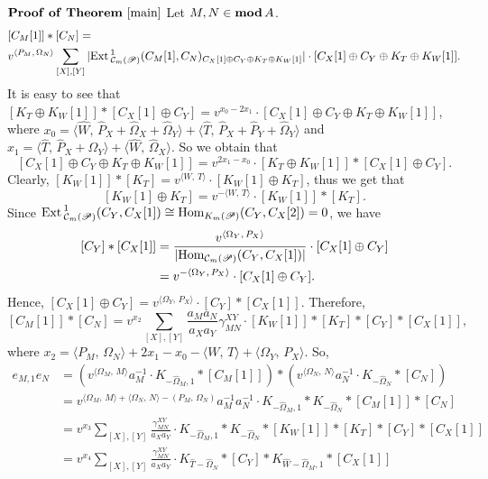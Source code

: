 \documentclass[reqno,12pt]{amsart}
\numberwithin{equation}{section}
\theoremstyle{plain}
\theoremstyle{definition}
\begin{document}
\noindent $\mathbf{Proof~of~Theorem~\ref{main}}$ Let $M,N\in{\mbox{\rm \textbf{mod}}\,} A$.
\begin{equation*}\begin{split}&[C_M[1]]\ast[C_N]=\\&v^{{\langle {P_M,\,\Omega_N}\rangle}}\sum\limits_{[X],[Y]}
|{\mbox{\rm Ext}\,}^1_{\mathcal{C}_m({{\mathscr{P}}})}(C_M[1],C_N)_{C_X[1]\oplus C_Y\oplus K_T\oplus K_W[1]}|\cdot[C_X[1]\oplus C_Y\oplus K_T\oplus K_W[1]].\end{split}\end{equation*}
It is easy to see that $[K_T\oplus K_W[1]]\ast[C_X[1]\oplus C_Y]=v^{x_0-2x_1}\cdot[C_X[1]\oplus C_Y\oplus K_T\oplus K_W[1]]$, where $x_0={\langle {\hat{W},\,\hat{P}_X+\hat{\Omega}_X+\hat{\Omega}_Y}\rangle}+{\langle {\hat{T},\,\hat{P}_X+\hat{P}_Y+\hat{\Omega}_Y}\rangle}$ and $x_1={\langle {\hat{T},\,\hat{P}_X+\hat{\Omega}_Y}\rangle}+{\langle {\hat{W},\,\hat{\Omega}_X}\rangle}$. So we obtain that
$$[C_X[1]\oplus C_Y\oplus K_T\oplus K_W[1]]=v^{2x_1-x_0}\cdot[K_T\oplus K_W[1]]\ast[C_X[1]\oplus C_Y].$$
Clearly, $[K_W[1]]\ast[K_T]=v^{{\langle {W,\,T}\rangle}}\cdot[K_W[1]\oplus K_T]$, thus we get that
$$[K_W[1]\oplus K_T]=v^{-{\langle {W,\,T}\rangle}}\cdot[K_W[1]]\ast[K_T].$$
Since ${\mbox{\rm Ext}\,}_{\mathcal{C}_m({{\mathscr{P}}})}^1(C_Y,C_X[1])\cong{\mbox{\rm Hom}}_{K_m({{\mathscr{P}}})}(C_Y,C_X[2])=0$,
we have
\begin{equation*}\begin{split}[C_Y]\ast[C_X[1]]&=\frac{v^{{\langle {\Omega_Y,\,P_X}\rangle}}}{|{\mbox{\rm Hom}}_{\mathcal{C}_m({{\mathscr{P}}})}(C_Y,C_X[1])|}\cdot[C_X[1]\oplus C_Y]\\&=
v^{-{\langle {\Omega_Y,\,P_X}\rangle}}\cdot[C_X[1]\oplus C_Y].\end{split}\end{equation*}
Hence, $[C_X[1]\oplus C_Y]=v^{{\langle {\Omega_Y,\,P_X}\rangle}}\cdot[C_Y]\ast[C_X[1]].$
Therefore, $$[C_M[1]]\ast[C_N]=v^{x_2}\sum\limits_{[X],[Y]}\frac{a_Ma_N}{{a_X}a_Y}\gamma_{MN}^{XY}
\cdot[K_W[1]]\ast[K_T]\ast[C_Y]\ast[C_X[1]],$$ where $x_2={\langle {P_M,\,\Omega_N}\rangle}+2x_1-x_0-{\langle {W,\,T}\rangle}+{\langle {\Omega_Y,\,P_X}\rangle}$. So,
\begin{equation*}\begin{split}
e_{M,1}e_N&=(v^{{\langle {\Omega_M,\,M}\rangle}}a_M^{-1}\cdot K_{-\hat{\Omega}_M,1}\ast[C_M[1]])\ast
(v^{{\langle {\Omega_N,\,N}\rangle}}a_N^{-1}\cdot K_{-\hat{\Omega}_N}\ast[C_N])\\
&=v^{{\langle {\Omega_M,\,M}\rangle}+{\langle {\Omega_N,\,N}\rangle}-(P_M,\,\Omega_N)}a_M^{-1}a_N^{-1}\cdot K_{-\hat{\Omega}_M,1}\ast
K_{-\hat{\Omega}_N}\ast[C_M[1]]\ast[C_N]\\&=
v^{x_3}\sum\limits_{[X],[Y]}\frac{\gamma_{MN}^{XY}}{a_Xa_Y}\cdot K_{-\hat{\Omega}_M,1}\ast K_{-\hat{\Omega}_N}
\ast[K_W[1]]\ast[K_T]\ast[C_Y]\ast[C_X[1]]\\&=
v^{x_4}\sum\limits_{[X],[Y]}\frac{\gamma_{MN}^{XY}}{a_Xa_Y}\cdot K_{\hat{T}-\hat{\Omega}_N}
\ast[C_Y]\ast K_{\hat{W}-\hat{\Omega}_M,1}\ast[C_X[1]]
\end{split}\end{equation*}
\end{document}

